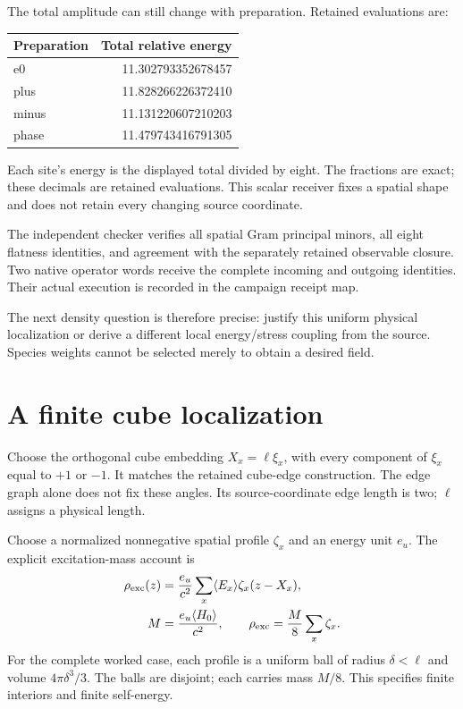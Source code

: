 \documentclass[10pt,twocolumn,letterpaper]{article}
\begin{document}
The total amplitude can still change with preparation. Retained evaluations are:
\begin{center}
\small
\begin{tabular}{@{}lr@{}}
\toprule
Preparation & Total relative energy\\
\midrule
e0 & 11.302793352678457\\
plus & 11.828266226372410\\
minus & 11.131220607210203\\
phase & 11.479743416791305\\
\bottomrule
\end{tabular}
\end{center}
Each site's energy is the displayed total divided by eight. The fractions are exact; these decimals are retained evaluations. This scalar receiver fixes a spatial shape and does not retain every changing source coordinate.

The independent checker verifies all spatial Gram principal minors, all eight flatness identities, and agreement with the separately retained observable closure. Two native operator words receive the complete incoming and outgoing identities. Their actual execution is recorded in the campaign receipt map.

The next density question is therefore precise: justify this uniform physical localization or derive a different local energy/stress coupling from the source. Species weights cannot be selected merely to obtain a desired field.


\section{A finite cube localization}
Choose the orthogonal cube embedding $X_x=\ell\xi_x$, with every component of $\xi_x$ equal to $+1$ or $-1$. It matches the retained cube-edge construction. The edge graph alone does not fix these angles. Its source-coordinate edge length is two; $\ell$ assigns a physical length.

Choose a normalized nonnegative spatial profile $\zeta_x$ and an energy unit $e_u$. The explicit excitation-mass account is
\[
\begin{aligned}
\rho_{\rm exc}(z)&=\frac{e_u}{c^2}\sum_x\langle E_x\rangle\zeta_x(z-X_x),\\
M&=\frac{e_u\langle H_0\rangle}{c^2},\qquad
\rho_{\rm exc}=\frac M8\sum_x\zeta_x.
\end{aligned}
\]
For the complete worked case, each profile is a uniform ball of radius $\delta<\ell$ and volume $4\pi\delta^3/3$. The balls are disjoint; each carries mass $M/8$. This specifies finite interiors and finite self-energy.
\end{document}
